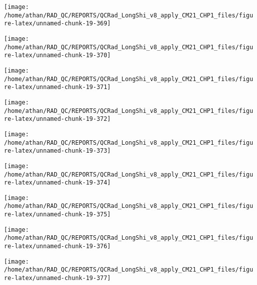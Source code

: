 \documentclass[
  10pt,
  a4paper,oneside]{article}
\begin{document}
\begin{center}\texttt{[image: /home/athan/RAD\_QC/REPORTS/QCRad\_LongShi\_v8\_apply\_CM21\_CHP1\_files/figure-latex/unnamed-chunk-19-369]} \end{center}

\begin{center}\texttt{[image: /home/athan/RAD\_QC/REPORTS/QCRad\_LongShi\_v8\_apply\_CM21\_CHP1\_files/figure-latex/unnamed-chunk-19-370]} \end{center}

\begin{center}\texttt{[image: /home/athan/RAD\_QC/REPORTS/QCRad\_LongShi\_v8\_apply\_CM21\_CHP1\_files/figure-latex/unnamed-chunk-19-371]} \end{center}

\begin{center}\texttt{[image: /home/athan/RAD\_QC/REPORTS/QCRad\_LongShi\_v8\_apply\_CM21\_CHP1\_files/figure-latex/unnamed-chunk-19-372]} \end{center}

\begin{center}\texttt{[image: /home/athan/RAD\_QC/REPORTS/QCRad\_LongShi\_v8\_apply\_CM21\_CHP1\_files/figure-latex/unnamed-chunk-19-373]} \end{center}

\begin{center}\texttt{[image: /home/athan/RAD\_QC/REPORTS/QCRad\_LongShi\_v8\_apply\_CM21\_CHP1\_files/figure-latex/unnamed-chunk-19-374]} \end{center}

\begin{center}\texttt{[image: /home/athan/RAD\_QC/REPORTS/QCRad\_LongShi\_v8\_apply\_CM21\_CHP1\_files/figure-latex/unnamed-chunk-19-375]} \end{center}

\begin{center}\texttt{[image: /home/athan/RAD\_QC/REPORTS/QCRad\_LongShi\_v8\_apply\_CM21\_CHP1\_files/figure-latex/unnamed-chunk-19-376]} \end{center}

\begin{center}\texttt{[image: /home/athan/RAD\_QC/REPORTS/QCRad\_LongShi\_v8\_apply\_CM21\_CHP1\_files/figure-latex/unnamed-chunk-19-377]} \end{center}
\end{document}

